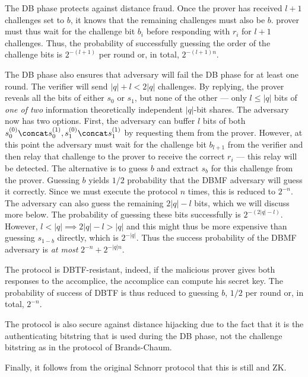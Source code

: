 The \ac{DB} phase protects against distance fraud.
Once the prover has received \(l+1\) challenges set to \(b\), it knows that the 
remaining challenges must also be \(b\).
 prover must thus wait for the challenge bit \(b_i\) before 
responding with \(r_i\) for \(l+1\) challenges.
Thus, the probability of successfully guessing the order of the challenge bits 
is \(2^{-(l+1)}\) per round or, in total, \(2^{-(l+1)n}\).

The \ac{DB} phase also ensures that  adversary will fail the \ac{DB} 
phase for at least one round.
The verifier will send \(|q| + l < 2|q|\) challenges.
By replying, the prover reveals all the bits of either \(s_0\) or \(s_1\), but 
none of the other --- only \(l\leq |q|\) bits of \emph{one of two} information 
theoretically independent \(|q|\)-bit shares.
The adversary now has two options.
First, the adversary can buffer \(l\) bits of both \(s_0^{(0)}\concat 
  s_0^{(1)}, s_1^{(0)}\concat s_1^{(1)}\) by requesting them from the prover.
However, at this point the adversary must wait for the challenge bit 
\(b_{l+1}\) from the verifier and then relay that challenge to the prover to 
receive the correct \(r_i\) --- this relay will be detected.
The alternative is to guess \(b\) and extract \(s_b\) for this challenge from 
the prover.
Guessing \(b\) yields \(1/2\) probability that the \ac{DBMF} adversary will 
guess it correctly.
Since we must execute the protocol \(n\) times, this is reduced to \(2^{-n}\).
The adversary can also guess the remaining \(2|q|-l\) bits, which we will 
discuss more below.
The probability of guessing these bits successfully is \(2^{-(2|q|-l)}\).
However, \(l < |q| \implies 2|q|-l > |q|\) and this might thus be more 
expensive than guessing \(s_{1-b}\) directly, which is \(2^{-|q|}\).
Thus the success probability of the \ac{DBMF} adversary is \emph{at most} 
\(2^{-n}+2^{-|q|n}\).

The protocol is \ac{DBTF}-resistant, indeed, if the malicious prover gives both 
responses to the accomplice, the accomplice can compute his secret key.
The probability of success of \ac{DBTF} is thus reduced to guessing \(b\), \ie 
\(1/2\) per round or, in total, \(2^{-n}\).

The protocol is also secure against distance hijacking due to the fact
that it is the authenticating bitstring that is used during the \ac{DB}
phase, not the challenge bitstring as in the protocol of Brands-Chaum.

Finally, it follows from the original Schnorr protocol that this is still 
 and \ac{ZK}.

